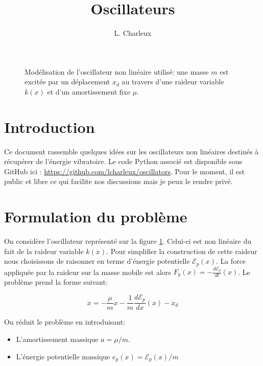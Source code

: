 \documentclass[a4paper,11pt,twoside]{article}
\author{L. Charleux}
\title{Oscillateurs}
\date{}
\begin{document}
\maketitle


\begin{figure}[t]
\begin{center}

\end{center}
\caption{Modélisation de l'oscillateur non linéaire utilisé: une masse $m$ est excitée par un déplacement  $x_d$ au travers d'une raideur variable $k(x)$ et d'un amortissement fixe $\mu$.}
\label{fig:oscillator_structure}
\end{figure}

\section*{Introduction}

\noindent Ce document rassemble quelques idées sur les oscillateurs non linéaires destinés à récupérer de l'énergie vibratoire. Le code Python associé est disponible sous GitHub ici : \url{https://github.com/lcharleux/oscillators}. Pour le moment, il est public et libre ce qui facilite nos discussions mais je peux le rendre privé.

\section{Formulation du problème}

\noindent On considère l'oscillateur représenté sur la figure \ref{fig:oscillator_structure}. Celui-ci est non linéaire du fait de la raideur variable $k(x)$. Pour simplifier la construction de cette raideur nous choisissons de raisonner en terme d'énergie potentielle $\mathcal E_p(x)$. La force appliquée par la raideur sur la masse mobile est alors $F_k(x) = -\frac{d\mathcal E_p}{dt}(x)$. Le problème prend la forme suivant:

\begin{equation}
\ddot{x} = -\frac{\mu}{m} \dot{x} - \frac{1}{m}\frac{d\mathcal E_p}{dx}(x) - \ddot{x}_d
\end{equation}



\noindent  On réduit le problème en introduisant:
\begin{itemize}
\item L'amortissement massique $a = \mu / m$.
\item L'énergie potentielle massique $e_p(x) = \mathcal E_p(x) / m$

\end{itemize}
\end{document}
